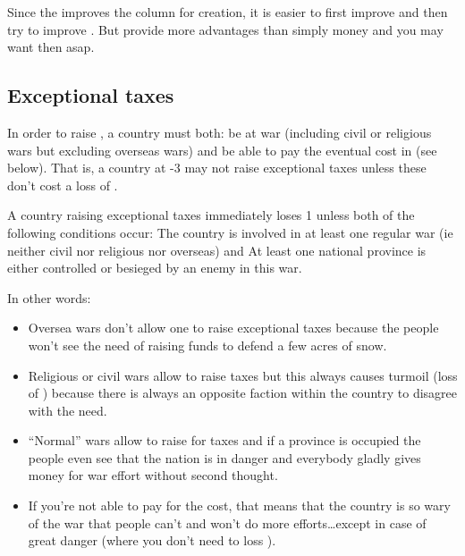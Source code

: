\begin{playtip}
  Since the \DTI improves the column for \MNU creation, it is easier to first
  improve \DTI and then try to improve \MNU. But \MNU provide more advantages
  than simply money and you may want then asap.
\end{playtip}



\subsection{Exceptional taxes}\label{chExpenses:Exceptional Taxes}

\aparag[Condition] In order to raise , a country must
both:
\bparag be at war (including civil or religious wars but excluding overseas
wars) and
\bparag be able to pay the eventual cost in \STAB (see below). That is, a
country at -3 \STAB may not raise exceptional taxes unless these don't cost a
loss of \STAB.

 A country raising exceptional taxes immediately loses 1
\STAB unless both of the following conditions occur:
\bparag The country is involved in at least one regular war (ie neither civil
nor religious nor overseas) and
\bparag At least one national province is either controlled or besieged by an
enemy in this war.

\begin{designnote}
  In other words:
  \begin{itemize}
  \item Oversea wars don't allow one to raise exceptional taxes because the
    people won't see the need of raising funds to defend a few acres of snow.
  \item Religious or civil wars allow to raise taxes but this always causes
    turmoil (loss of \STAB) because there is always an opposite faction within
    the country to disagree with the need.
  \item ``Normal'' wars allow to raise for taxes and if a province is occupied
    the people even see that the nation is in danger and everybody gladly
    gives money for war effort without second thought.
  \item If you're not able to pay for the \STAB cost, that means that the
    country is so wary of the war that people can't and won't do more
    efforts\ldots except in case of great danger (where you don't need to loss
    \STAB).
  \end{itemize}
\end{designnote}

